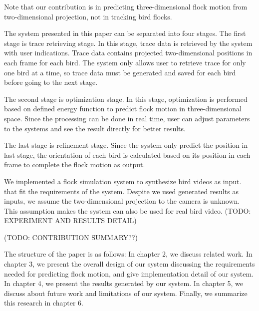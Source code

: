 Note that our contribution is in predicting three-dimensional flock motion from two-dimensional projection, not in tracking bird flocks.


The system presented in this paper can be separated into four stages. The first stage is trace retrieving stage. In this stage, trace data is retrieved by the system with user indications. Trace data contains projected two-dimensional positions in each frame for each bird. The system only allows user to retrieve trace for only one bird at a time, so trace data must be generated and saved for each bird before going to the next stage.


The second stage is optimization stage. In this stage, optimization is performed based on defined energy function to predict flock motion in three-dimensional space. Since the processing can be done in real time, user can adjust parameters to the systems and see the result directly for better results.


The last stage is refinement stage. Since the system only predict the position in last stage, the orientation of each bird is calculated based on its position in each frame to complete the flock motion as output.


We implemented a flock simulation system to synthesize bird videos as input. that fit the requirements of the system. Despite we used generated results as inputs, we assume the two-dimensional projection to the camera is unknown. This assumption makes the system can also be used for real bird video. (TODO: EXPERIMENT AND RESULTS DETAIL)


(TODO: CONTRIBUTION SUMMARY??)


The structure of the paper is as follows: In chapter 2, we discuss related work. In chapter 3, we present the overall design of our system discussing the requirements needed for predicting flock motion, and give implementation detail of our system. In chapter 4, we present the results generated by our system. In chapter 5, we discuss about future work and limitations of our system. Finally, we summarize this research in chapter 6.

